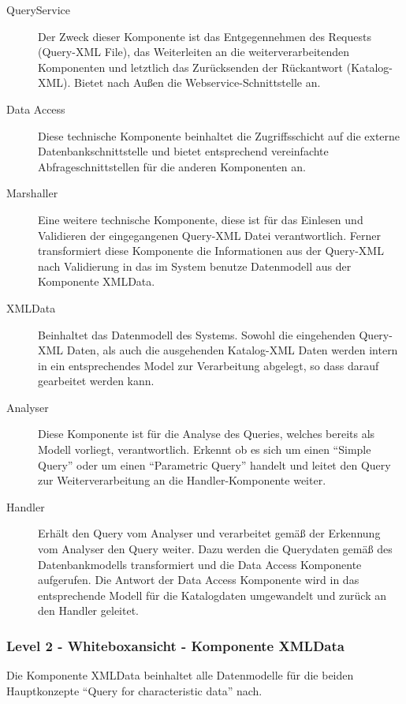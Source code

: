 \begin{description}
\item[QueryService] Der Zweck dieser Komponente ist das Entgegennehmen des Requests (Query-XML File), das Weiterleiten an die weiterverarbeitenden Komponenten und letztlich das Zurücksenden der Rückantwort (Katalog-XML). Bietet nach Außen die \gls{Webservice}-Schnittstelle an.
\item[Data Access] Diese technische Komponente beinhaltet die Zugriffsschicht auf die externe Datenbankschnittstelle und bietet entsprechend vereinfachte Abfrageschnittstellen für die anderen Komponenten an. 
\item[Marshaller] Eine weitere technische Komponente, diese ist für das Einlesen und Validieren der eingegangenen Query-XML Datei verantwortlich. Ferner transformiert diese Komponente die Informationen aus der Query-XML nach Validierung in das im System benutze Datenmodell aus der Komponente XMLData.
\item[XMLData] Beinhaltet das Datenmodell des Systems. Sowohl die eingehenden Query-XML Daten, als auch die ausgehenden Katalog-XML Daten werden intern in ein entsprechendes Model zur Verarbeitung abgelegt, so dass darauf gearbeitet werden kann.  
\item[Analyser] Diese Komponente ist für die Analyse des Queries, welches bereits als Modell vorliegt, verantwortlich. Erkennt ob es sich um einen \enquote{Simple Query} oder um einen \enquote{Parametric Query} handelt und leitet den Query zur Weiterverarbeitung an die Handler-Komponente weiter. 
\item[Handler] Erhält den Query vom Analyser und verarbeitet gemäß der Erkennung vom Analyser den Query weiter. Dazu werden die Querydaten gemäß des Datenbankmodells transformiert und die Data Access Komponente aufgerufen. Die Antwort der Data Access Komponente wird in das entsprechende Modell für die Katalogdaten umgewandelt und zurück an den Handler geleitet.  
\end{description}

\subsubsection{Level 2 - Whiteboxansicht - Komponente XMLData} 

Die Komponente XMLData beinhaltet alle Datenmodelle für die beiden Hauptkonzepte \enquote{Query for characteristic data} nach. 

